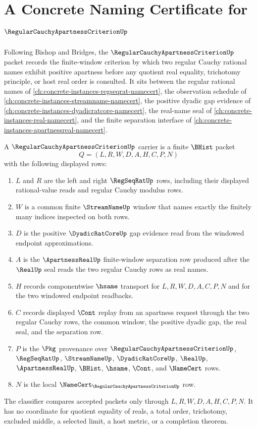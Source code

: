 \chapter{A Concrete Naming Certificate for $\RegularCauchyApartnessCriterionUp$}
\label{ch:concrete-instances-regular-cauchy-apartness-criterion-namecert}

Following Bishop and Bridges, the $\RegularCauchyApartnessCriterionUp$ packet records the finite-window criterion by which two regular Cauchy rational names exhibit positive apartness before any quotient real equality, trichotomy principle, or host real order is consulted. It sits between the regular rational names of \autoref{ch:concrete-instances-regseqrat-namecert}, the observation schedule of \autoref{ch:concrete-instances-streamname-namecert}, the positive dyadic gap evidence of \autoref{ch:concrete-instances-dyadicratcore-namecert}, the real-name seal of \autoref{ch:concrete-instances-real-namecert}, and the finite separation interface of \autoref{ch:concrete-instances-apartnessreal-namecert}.

\begin{definition}
\label{def:apartness-cauchy-criterion-carrier}
A $\RegularCauchyApartnessCriterionUp$ carrier is a finite $\BHist$ packet
$$
Q=(L,R,W,D,A,H,C,P,N)
$$
with the following displayed rows:
\begin{enumerate}
\item $L$ and $R$ are the left and right $\RegSeqRatUp$ rows, including their displayed rational-value reads and regular Cauchy modulus rows.
\item $W$ is a common finite $\StreamNameUp$ window that names exactly the finitely many indices inspected on both rows.
\item $D$ is the positive $\DyadicRatCoreUp$ gap evidence read from the windowed endpoint approximations.
\item $A$ is the $\ApartnessRealUp$ finite-window separation row produced after the $\RealUp$ seal reads the two regular Cauchy rows as real names.
\item $H$ records componentwise $\hsame$ transport for $L,R,W,D,A,C,P,N$ and for the two windowed endpoint readbacks.
\item $C$ records displayed $\Cont$ replay from an apartness request through the two regular Cauchy rows, the common window, the positive dyadic gap, the real seal, and the separation row.
\item $P$ is the $\Pkg$ provenance over $\RegularCauchyApartnessCriterionUp$, $\RegSeqRatUp$, $\StreamNameUp$, $\DyadicRatCoreUp$, $\RealUp$, $\ApartnessRealUp$, $\BHist$, $\hsame$, $\Cont$, and $\NameCert$ rows.
\item $N$ is the local $\NameCert_{\RegularCauchyApartnessCriterionUp}$ row.
\end{enumerate}
The classifier compares accepted packets only through $L,R,W,D,A,H,C,P,N$. It has no coordinate for quotient equality of reals, a total order, trichotomy, excluded middle, a selected limit, a host metric, or a completion theorem.
\end{definition}

